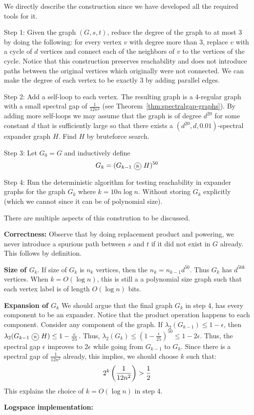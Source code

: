We directly describe the construction since we have developed all the required tools for it.

\begin{description}
\item{\sf Step 1:} Given the graph $(G,s,t)$, reduce the degree of the graph to at most $3$ by doing the following: 	for every vertex $v$ with degree more than $3$, replace $v$ with a cycle of $d$ vertices and connect each of the neighbors of $v$ to the vertices of the cycle. Notice that this construction preserves reachability and does not introduce paths between the original vertices which originally were not connected.
We can make the degree of each vertex to be exactly 3 by adding parallel edges.
\item{\sf Step 2:} Add a self-loop to each vertex. The resulting graph is a $4$-regular graph with a small spectral gap of $\frac{1}{12n^2}$ (see Theorem~\ref{thm:spectralgap-graphs}). By adding more self-loops we may assume that the graph is of degree $d^{20}$ for some constant $d$ that is sufficiently large so that there exists a $(d^{20},d,0.01)$-spectral expander graph $H$. Find $H$ by bruteforce search.
\item{\sf Step 3:} Let $G_0 = G$ and inductively define $$G_k = (G_{k-1} \circled{R} H)^{50}$$
\item{\sf Step 4:} Run the deterministic algorithm for testing reachability in expander graphs for the graph $G_k$ where $k = 10n \log n$. Without storing $G_k$ explicitly (which we cannot since it can be of polynomial size).
\end{description}

There are multiple aspects of this constrution to be discussed.
\begin{description}
\item{\bf Correctness:} Observe that by doing replacement product and powering, we never introduce a spurious path between $s$ and $t$ if it did not exist in $G$ already. This follows by definition.
\item{\bf Size of $G_k$}. If size of $G_k$ is $n_k$ vertices, then the $n_{k} = n_{k-1}d^{50}$. Thus $G_k$ has $d^{50k}$ vertices. When $k = O(\log n)$, this is still a a polynomial size graph such that each vertex label is of length $O(\log n)$ bits.
\item{\bf Expansion of $G_k$} We should argue that the final graph $G_k$ in step 4, has every component to be an expander. Notice that the product operation happens to each component. Consider any component of the graph. If $\lambda_2(G_{k-1}) \le 1-\epsilon$, then $\lambda_2(G_{k-1} \circled{R} H) \le 1-\frac{\epsilon}{25}$. Thus, $\lambda_2(G_k) \le \left(1-\frac{\epsilon}{25}\right)^{50} \le 1-2\epsilon$.
Thus, the spectral gap $\epsilon$ improves to $2\epsilon$ while going from $G_{k-1}$ to $G_k$. Since there is a spectral gap of $\frac{1}{12n^2}$ already, this implies, we should choose $k$ such that:
$$2^k\left( \frac{1}{12n^2} \right) > \frac{1}{2}$$
This explains the choice of $k = O(\log n)$ in step 4.
\item{\bf Logspace implementation:}
\end{description}

